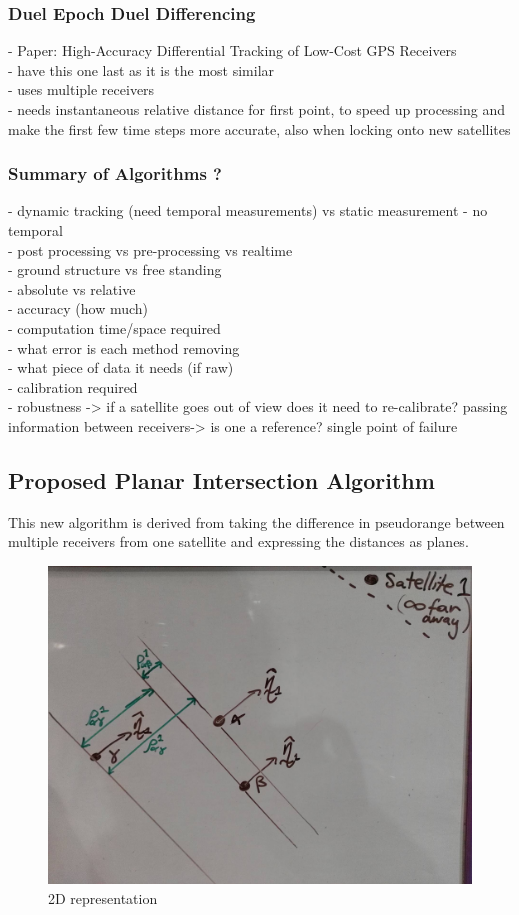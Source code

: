 \documentclass[11pt,a4paper]{article}
\begin{document}
\subsubsection{Duel Epoch Duel Differencing}
- Paper: High-Accuracy Differential Tracking of Low-Cost GPS Receivers\\
- have this one last as it is the most similar\\
- uses multiple receivers\\
- needs instantaneous relative distance for first point, to speed up processing and make the first few time steps more accurate, also when locking onto new satellites


\subsubsection{Summary of Algorithms ?}

- dynamic tracking (need temporal measurements) vs static measurement - no temporal\\
- post processing vs pre-processing vs realtime\\
- ground structure vs free standing\\
- absolute vs relative\\
- accuracy (how much)\\
- computation time/space required\\
- what error is each method removing\\
- what piece of data it needs (if raw)\\
- calibration required\\
- robustness -> if a satellite goes out of view does it need to re-calibrate? passing information between receivers-> is one a reference? single point of failure



\subsection{Proposed Planar Intersection Algorithm}
This new algorithm is derived from taking the difference in pseudorange between multiple receivers from one satellite and expressing the distances as planes.
\begin{figure}[h]
\centering
\caption{2D representation}
\label{fig:overall_singleS_multiR}
\includegraphics[width=0.7\linewidth]{overall_singleS_multiR}
\end{figure}
\end{document}
